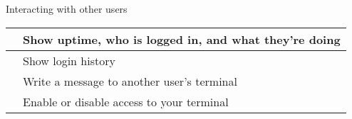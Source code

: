 \begin{block}{Interacting with other users}
  \begin{tabu} to 0.9\linewidth { X X[4] }
     & Show uptime, who is logged in, and what they're doing \\ \hline
     & Show login history \\ \hline
     & Write a message to another user's terminal \\ \hline
     & Enable or disable  access to your terminal
  \end{tabu}
\end{block}
